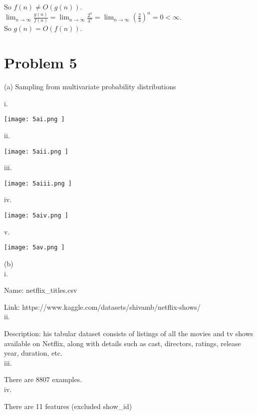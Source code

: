 \documentclass[12pt]{article}
\begin{document}
So $f(n) \neq O(g(n))$.\\

$\lim_{n \to \infty} \frac{g(n)}{f(n)} = \lim_{n \to \infty} \frac{2^n}{3^n} = \lim_{n \to \infty} (\frac{2}{3})^n = 0 < \infty$.\\

So $g(n) = O(f(n))$. \\
\pagebreak
\section*{Problem 5}

(a) Sampling from multivariate probability distributions

i.
\begin{center}
\texttt{[image:  5ai.png ]}
\end{center}
\pagebreak

ii.
\begin{center}
\texttt{[image:  5aii.png ]}
\end{center}

iii.
\begin{center}
\texttt{[image:  5aiii.png ]}
\end{center}

iv.
\begin{center}
\texttt{[image:  5aiv.png ]}
\end{center}

v.
\begin{center}
\texttt{[image:  5av.png ]}
\end{center}

\noindent(b)\\

i.

Name: netflix\_titles.csv

Link: https://www.kaggle.com/datasets/shivamb/netflix-shows/\\

ii.

Description: his tabular dataset consists of listings of all the movies and tv shows available on Netflix, along with details such as cast, directors, ratings, release year, duration, etc.\\

iii.

There are 8807 examples.\\

iv. 

There are 11 features (excluded show\_id)
\end{document}
